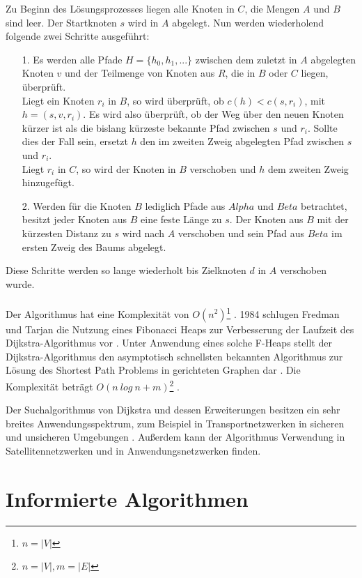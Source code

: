 Zu Beginn des Lösungsprozesses liegen alle Knoten in $C$, die Mengen $A$ und $B$ sind leer. Der Startknoten $s$ wird in $A$ abgelegt. Nun werden wiederholend folgende zwei Schritte ausgeführt:
\begin{itemize}
	\item[1.] Es werden alle Pfade $H = \{h_0, h_1, ...\}$ zwischen dem zuletzt in $A$ abgelegten Knoten $v$ und der Teilmenge von Knoten aus $R$, die in $B$ oder $C$ liegen, überprüft.\\ Liegt ein Knoten $r_i$ in $B$, so wird überprüft, ob $c(h) < c(s,r_i)$, mit $h = \left(s, v, r_i\right)$. Es wird also überprüft, ob der Weg über den neuen Knoten kürzer ist als die bislang kürzeste bekannte Pfad zwischen $s$ und $r_i$. Sollte dies der Fall sein, ersetzt $h$ den im zweiten Zweig abgelegten Pfad zwischen $s$ und $r_i$. \\Liegt $r_i$ in $C$, so wird der Knoten in $B$ verschoben und $h$ dem zweiten Zweig hinzugefügt.
	\item[2.] Werden für die Knoten $B$ lediglich Pfade aus $Alpha$ und $Beta$ betrachtet, besitzt jeder Knoten aus $B$ eine feste Länge zu $s$. Der Knoten aus $B$ mit der kürzesten Distanz zu $s$ wird nach $A$ verschoben und sein Pfad aus $Beta$ im ersten Zweig des Baums abgelegt.
\end{itemize}
Diese Schritte werden so lange wiederholt bis Zielknoten $d$ in $A$ verschoben wurde. \\ \\	
Der Algorithmus hat eine Komplexität von $O(n^2)$\footnote{$n = |V|$} \cite[S.5]{Madkour.2017}. 1984 schlugen Fredman und Tarjan die Nutzung eines Fibonacci Heaps zur Verbesserung der Laufzeit des Dijkstra-Algorithmus vor \cite{Fredman.1987}. Unter Anwendung eines solche F-Heaps stellt der Dijkstra-Algorithmus den asymptotisch schnellsten bekannten Algorithmus zur Lösung des Shortest Path Problems in gerichteten Graphen dar \cite{Schmitz.2019}.  Die Komplexität beträgt $O(n\ log\ n + m)$\footnote{$n = |V|, m = |E|$} \cite[S.5]{Madkour.2017}.

Der Suchalgorithmus von Dijkstra und dessen Erweiterungen besitzen ein sehr breites Anwendungsspektrum, zum Beispiel in Transportnetzwerken in sicheren \cite{BAN17} und unsicheren Umgebungen \cite{DCZM12}. Außerdem kann der Algorithmus Verwendung in Satellitennetzwerken \cite{HH15} und in Anwendungsnetzwerken \cite{JYA14} finden.

\section{Informierte Algorithmen}

